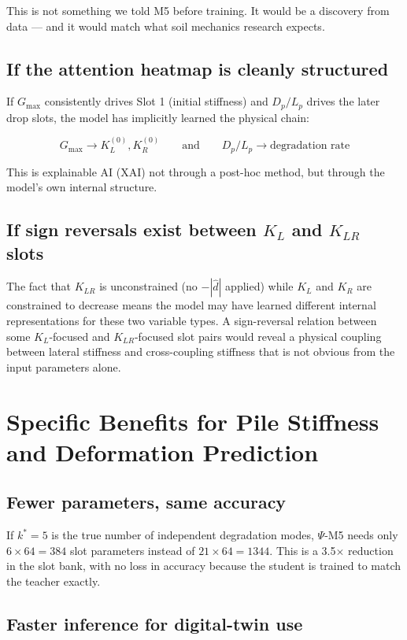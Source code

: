 \documentclass[11pt,a4paper]{article}
\begin{document}
This is not something we told M5 before training. It would be a discovery from data --- and it would match what soil mechanics research expects.

\subsection*{If the attention heatmap is cleanly structured}

If $G_{\max}$ consistently drives Slot 1 (initial stiffness) and $D_p/L_p$ drives the later drop slots, the model has implicitly learned the physical chain:

$$
G_{\max} \rightarrow K_L^{(0)}, K_R^{(0)} \qquad \text{and} \qquad D_p/L_p \rightarrow \text{degradation rate}
$$

This is explainable AI (XAI) not through a post-hoc method, but through the model's own internal structure.

\subsection*{If sign reversals exist between $K_L$ and $K_{LR}$ slots}

The fact that $K_{LR}$ is unconstrained (no $-|\hat{d}|$ applied) while $K_L$ and $K_R$ are constrained to decrease means the model may have learned different internal representations for these two variable types. A sign-reversal relation between some $K_L$-focused and $K_{LR}$-focused slot pairs would reveal a physical coupling between lateral stiffness and cross-coupling stiffness that is not obvious from the input parameters alone.

\section{Specific Benefits for Pile Stiffness and Deformation Prediction}

\subsection{Fewer parameters, same accuracy}

If $k^* = 5$ is the true number of independent degradation modes, $\Psi$-M5 needs only $6 \times 64 = 384$ slot parameters instead of $21 \times 64 = 1344$. This is a 3.5$\times$ reduction in the slot bank, with no loss in accuracy because the student is trained to match the teacher exactly.

\subsection{Faster inference for digital-twin use}
\end{document}
